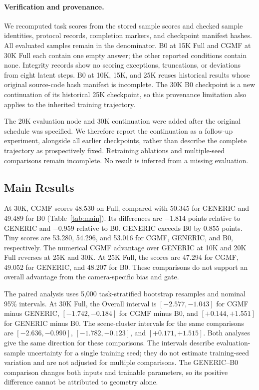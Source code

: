 \paragraph{Verification and provenance.}
We recomputed task scores from the stored sample scores and checked sample identities, protocol records, completion markers, and checkpoint manifest hashes. All evaluated samples remain in the denominator. B0 at 15K Full and CGMF at 30K Full each contain one empty answer; the other reported conditions contain none. Integrity records show no scoring exceptions, truncations, or deviations from eight latent steps. B0 at 10K, 15K, and 25K reuses historical results whose original source-code hash manifest is incomplete. The 30K B0 checkpoint is a new continuation of its historical 25K checkpoint, so this provenance limitation also applies to the inherited training trajectory.

The 20K evaluation node and 30K continuation were added after the original schedule was specified. We therefore report the continuation as a follow-up experiment, alongside all earlier checkpoints, rather than describe the complete trajectory as prospectively fixed. Retraining ablations and multiple-seed comparisons remain incomplete. No result is inferred from a missing evaluation.

\subsection{Main Results}

At 30K, CGMF scores 48.530 on Full, compared with 50.345 for GENERIC and 49.489 for B0 (Table~\ref{tab:main}). Its differences are $-1.814$ points relative to GENERIC and $-0.959$ relative to B0. GENERIC exceeds B0 by 0.855 points. Tiny scores are 53.280, 54.296, and 53.016 for CGMF, GENERIC, and B0, respectively. The numerical CGMF advantage over GENERIC at 10K and 20K Full reverses at 25K and 30K. At 25K Full, the scores are 47.294 for CGMF, 49.052 for GENERIC, and 48.207 for B0. These comparisons do not support an overall advantage from the camera-specific bias and gate.

The paired analysis uses 5,000 task-stratified bootstrap resamples and nominal 95\% intervals. At 30K Full, the Overall interval is $[-2.577,-1.043]$ for CGMF minus GENERIC, $[-1.742,-0.184]$ for CGMF minus B0, and $[+0.144,+1.551]$ for GENERIC minus B0. The scene-cluster intervals for the same comparisons are $[-2.636,-0.990]$, $[-1.782,-0.123]$, and $[+0.171,+1.515]$. Both analyses give the same direction for these comparisons. The intervals describe evaluation-sample uncertainty for a single training seed; they do not estimate training-seed variation and are not adjusted for multiple comparisons. The GENERIC--B0 comparison changes both inputs and trainable parameters, so its positive difference cannot be attributed to geometry alone.


